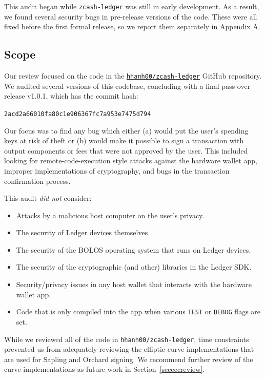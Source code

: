 \documentclass[10pt,titlepage]{article}
\begin{document}
This audit began while \texttt{zcash-ledger} was still in early development. As
a result, we found several security bugs in pre-release versions of the code.
These were all fixed before the first formal release, so we report them
separately in Appendix A.

\subsection{Scope}

Our review focused on the code in the \href{https://github.com/hhanh00/zcash-ledger}{\texttt{hhanh00/zcash-ledger}} GitHub
repository. We audited several versions of this codebase, concluding with a
final pass over release v1.0.1, which has the commit hash:

\begin{center}
      \texttt{2acd2a66010fa80c1e906367fc7a953e7475d794}
\end{center}

Our focus was to find any bug which either (a) would put the user's spending keys at
risk of theft or (b) would make it possible to sign a transaction with output
components or fees that were not approved by the user. This included looking for
remote-code-execution style attacks against the hardware wallet app, improper
implementations of cryptography, and bugs in the transaction confirmation
process.

This audit \emph{did not} consider:

\begin{itemize}
      \item Attacks by a malicious host computer on the user's privacy.
      \item The security of Ledger devices themselves.
      \item The security of the BOLOS operating system that runs on Ledger devices.
      \item The security of the cryptographic (and other) libraries in the Ledger SDK.
      \item Security/privacy issues in any host wallet that interacts with the hardware wallet app.
      \item Code that is only compiled into the app when various \texttt{TEST} or \texttt{DEBUG} flags are set.
\end{itemize}

While we reviewed all of the code in \texttt{hhanh00/zcash-ledger}, time
constraints prevented us from adequately reviewing the elliptic curve
implementations that are used for Sapling and Orchard signing. We recommend
further review of the curve implementations as future work in
Section~\ref{sececcreview}.
\end{document}
